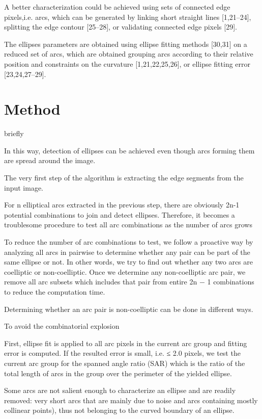\documentclass[a4paper]{report}
\begin{document}
A better characterization could be achieved using sets of
connected edge pixels,i.e. arcs, which can be generated by linking
short straight lines [1,21–24], splitting the edge contour [25–28],
or validating connected edge pixels [29].

The ellipses parameters
are obtained using ellipse fitting methods [30,31] on a reduced set
of arcs, which are obtained grouping arcs according to their
relative position and constraints on the curvature [1,21,22,25,26],
or ellipse fitting error [23,24,27–29].

\section{Method}
briefly

In this way, detection of ellipses can be achieved even though arcs forming them are spread around the image.

The very first step of the algorithm is extracting the edge segments from the input image.

For n elliptical arcs extracted in the previous step, there are obviously 2n-1 potential combinations to join and detect ellipses.
Therefore, it becomes a troublesome procedure to test all arc combinations as the number of arcs grows

To reduce the number of arc combinations to test, we follow a proactive way by analyzing all arcs in pairwise to determine whether any pair can be part of the same ellipse or not. In other words, we try to find out whether any
two arcs are coelliptic or non-coelliptic. Once we determine any non-coelliptic arc pair, we remove all arc subsets which includes that pair from entire 2n − 1 combinations to reduce the computation time.

Determining whether an arc pair is non-coelliptic can be done in different ways.

To avoid the combinatorial explosion


First, ellipse fit is applied to all arc pixels in the current arc group and fitting error is computed. 
If the resulted error is small, i.e. ≤ 2.0 pixels, we test the current arc group for the spanned angle ratio
(SAR) which is the ratio of the total length of arcs in the group over the perimeter of the yielded ellipse.


Some arcs are not salient enough to characterize an ellipse
and are readily removed: very short arcs that are
mainly due to noise and arcs containing mostly collinear points), thus not belonging to the curved
boundary of an ellipse.
\end{document}
